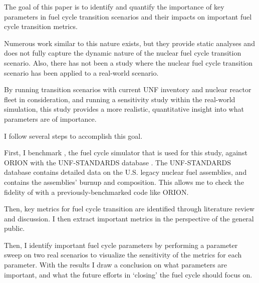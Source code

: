 The goal of this paper is to identify and quantify the
importance of key parameters in fuel cycle transition scenarios
and their impacts on important fuel cycle transition metrics.

Numerous work similar to this nature exists, but they provide
static analyses and does not fully capture the dynamic nature
of the nuclear fuel cycle transition scenario. Also, there
has not been a study where the nuclear fuel cycle transition
scenario has been applied to a real-world scenario.

By running transition scenarios with current \gls{UNF}
inventory and nuclear reactor fleet in consideration,
and running a sensitivity study within the real-world simulation,
this study provides a more realistic, quantitative insight
into what parameters are of importance.

I follow several steps to accomplish this goal.

First, I benchmark \Cyclus, the fuel cycle simulator that is used for this study,
against \gls{ORION} \cite{gregg_analysis_2012} with the \gls{UNF-STANDARDS} database
\cite{peterson_used_2013}. The \gls{UNF-STANDARDS} database contains detailed
data on the U.S. legacy nuclear fuel assemblies, and contains the
assemblies' burnup and composition. This allows me to check the fidelity
of \Cyclus with a previously-benchmarked code like \gls{ORION}.

Then, key metrics for fuel cycle transition
are identified through literature review and discussion. I then
extract important metrics in the perspective of the general public.

Then, I identify important fuel cycle parameters by performing a parameter
sweep on two real scenarios to visualize the sensitivity of the metrics
for each parameter. With the results I draw a conclusion on what parameters
are important, and what the future efforts in `closing' the fuel cycle
should focus on.
